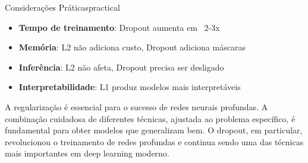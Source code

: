 \documentclass[a4paper,12pt]{article}
\begin{document}
\begin{observacao}{Considerações Práticas}{practical}
\begin{itemize}
    \item \textbf{Tempo de treinamento}: Dropout aumenta em ~2-3x
    \item \textbf{Memória}: L2 não adiciona custo, Dropout adiciona máscaras
    \item \textbf{Inferência}: L2 não afeta, Dropout precisa ser desligado
    \item \textbf{Interpretabilidade}: L1 produz modelos mais interpretáveis
\end{itemize}
\end{observacao}

A regularização é essencial para o sucesso de redes neurais profundas. A combinação cuidadosa de diferentes técnicas, ajustada ao problema específico, é fundamental para obter modelos que generalizam bem. O dropout, em particular, revolucionou o treinamento de redes profundas e continua sendo uma das técnicas mais importantes em deep learning moderno.
\end{document}
